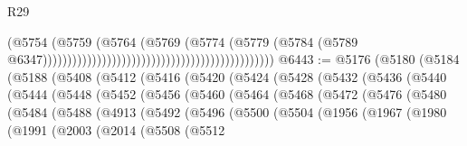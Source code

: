 \begin{lexlean}{R29}
\begin{coremodule}
                                                                                  (@5754
                                                                                    (@5759
                                                                                      (@5764
                                                                                        (@5769
                                                                                          (@5774
                                                                                            (@5779
                                                                                              (@5784
                                                                                                (@5789
                                                                                                  @6347)))))))))))))))))))))))))))))))))))))))))))))))
@6443 := @5176
    (@5180
      (@5184
        (@5188
          (@5408
            (@5412
              (@5416
                (@5420
                  (@5424
                    (@5428
                      (@5432
                        (@5436
                          (@5440
                            (@5444
                              (@5448
                                (@5452
                                  (@5456
                                    (@5460
                                      (@5464
                                        (@5468
                                          (@5472
                                            (@5476
                                              (@5480
                                                (@5484
                                                  (@5488
                                                    (@4913
                                                      (@5492
                                                        (@5496
                                                          (@5500
                                                            (@5504
                                                              (@1956
                                                                (@1967
                                                                  (@1980
                                                                    (@1991
                                                                      (@2003
                                                                        (@2014
                                                                          (@5508
                                                                            (@5512

\end{coremodule}
\end{lexlean}
